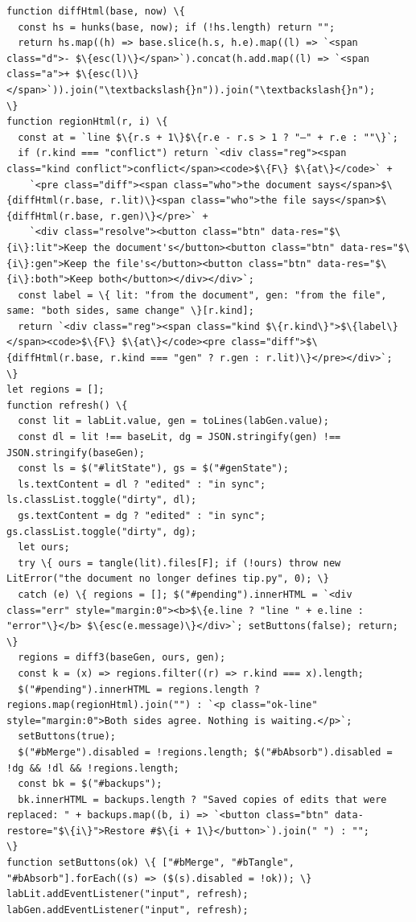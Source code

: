 \documentclass[10pt,a4paper]{article}
\begin{document}
\begin{Verbatim}
function diffHtml(base, now) \{
  const hs = hunks(base, now); if (!hs.length) return "";
  return hs.map((h) => base.slice(h.s, h.e).map((l) => `<span class="d">- $\{esc(l)\}</span>`).concat(h.add.map((l) => `<span class="a">+ $\{esc(l)\}</span>`)).join("\textbackslash{}n")).join("\textbackslash{}n");
\}
function regionHtml(r, i) \{
  const at = `line $\{r.s + 1\}$\{r.e - r.s > 1 ? "–" + r.e : ""\}`;
  if (r.kind === "conflict") return `<div class="reg"><span class="kind conflict">conflict</span><code>$\{F\} $\{at\}</code>` +
    `<pre class="diff"><span class="who">the document says</span>$\{diffHtml(r.base, r.lit)\}<span class="who">the file says</span>$\{diffHtml(r.base, r.gen)\}</pre>` +
    `<div class="resolve"><button class="btn" data-res="$\{i\}:lit">Keep the document's</button><button class="btn" data-res="$\{i\}:gen">Keep the file's</button><button class="btn" data-res="$\{i\}:both">Keep both</button></div></div>`;
  const label = \{ lit: "from the document", gen: "from the file", same: "both sides, same change" \}[r.kind];
  return `<div class="reg"><span class="kind $\{r.kind\}">$\{label\}</span><code>$\{F\} $\{at\}</code><pre class="diff">$\{diffHtml(r.base, r.kind === "gen" ? r.gen : r.lit)\}</pre></div>`;
\}
let regions = [];
function refresh() \{
  const lit = labLit.value, gen = toLines(labGen.value);
  const dl = lit !== baseLit, dg = JSON.stringify(gen) !== JSON.stringify(baseGen);
  const ls = $("#litState"), gs = $("#genState");
  ls.textContent = dl ? "edited" : "in sync"; ls.classList.toggle("dirty", dl);
  gs.textContent = dg ? "edited" : "in sync"; gs.classList.toggle("dirty", dg);
  let ours;
  try \{ ours = tangle(lit).files[F]; if (!ours) throw new LitError("the document no longer defines tip.py", 0); \}
  catch (e) \{ regions = []; $("#pending").innerHTML = `<div class="err" style="margin:0"><b>$\{e.line ? "line " + e.line : "error"\}</b> $\{esc(e.message)\}</div>`; setButtons(false); return; \}
  regions = diff3(baseGen, ours, gen);
  const k = (x) => regions.filter((r) => r.kind === x).length;
  $("#pending").innerHTML = regions.length ? regions.map(regionHtml).join("") : `<p class="ok-line" style="margin:0">Both sides agree. Nothing is waiting.</p>`;
  setButtons(true);
  $("#bMerge").disabled = !regions.length; $("#bAbsorb").disabled = !dg && !dl && !regions.length;
  const bk = $("#backups");
  bk.innerHTML = backups.length ? "Saved copies of edits that were replaced: " + backups.map((b, i) => `<button class="btn" data-restore="$\{i\}">Restore #$\{i + 1\}</button>`).join(" ") : "";
\}
function setButtons(ok) \{ ["#bMerge", "#bTangle", "#bAbsorb"].forEach((s) => ($(s).disabled = !ok)); \}
labLit.addEventListener("input", refresh); labGen.addEventListener("input", refresh);


\end{Verbatim}
\end{document}
